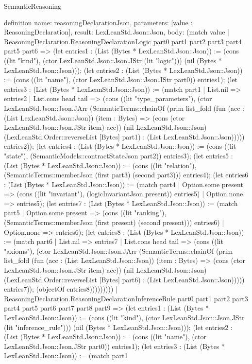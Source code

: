 \begin{lexlean}{SemanticReasoning}
\begin{semanticmodule}
definition{
  name: reasoningDeclarationJson,
  parameters: [value : ReasoningDeclaration],
  result: LexLeanStd.Json::Json,
  body: (match value
    | ReasoningDeclaration.ReasoningDeclarationLogic part0 part1 part2 part3 part4 part5 part6 => (let entries1 : (List (Bytes * LexLeanStd.Json::Json)) := (cons ((lit "kind"), (ctor LexLeanStd.Json::Json.JStr (lit "logic"))) (nil (Bytes * LexLeanStd.Json::Json))); (let entries2 : (List (Bytes * LexLeanStd.Json::Json)) := (cons ((lit "name"), (ctor LexLeanStd.Json::Json.JStr part0)) entries1); (let entries3 : (List (Bytes * LexLeanStd.Json::Json)) := (match part1
      | List.nil => entries2
      | List.cons head tail => (cons ((lit "type_parameters"), (ctor LexLeanStd.Json::Json.JArr (SemanticTerms::chainOf (prim list_fold (fun (acc : (List LexLeanStd.Json::Json)) (item : Bytes) => (cons (ctor LexLeanStd.Json::Json.JStr item) acc)) (nil LexLeanStd.Json::Json) (LexLeanStd.Order::reverseList [Bytes] part1) : (List LexLeanStd.Json::Json))))) entries2)); (let entries4 : (List (Bytes * LexLeanStd.Json::Json)) := (cons ((lit "state"), (SemanticModels::contractStateJson part2)) entries3); (let entries5 : (List (Bytes * LexLeanStd.Json::Json)) := (cons ((lit "relation"), (SemanticTerms::memberJson (first part3) (second part3))) entries4); (let entries6 : (List (Bytes * LexLeanStd.Json::Json)) := (match part4
      | Option.some present => (cons ((lit "invariant"), (logicInvariantJson present)) entries5)
      | Option.none => entries5); (let entries7 : (List (Bytes * LexLeanStd.Json::Json)) := (match part5
      | Option.some present => (cons ((lit "ranking"), (SemanticTerms::memberJson (first present) (second present))) entries6)
      | Option.none => entries6); (let entries8 : (List (Bytes * LexLeanStd.Json::Json)) := (match part6
      | List.nil => entries7
      | List.cons head tail => (cons ((lit "axioms"), (ctor LexLeanStd.Json::Json.JArr (SemanticTerms::chainOf (prim list_fold (fun (acc : (List LexLeanStd.Json::Json)) (item : Bytes) => (cons (ctor LexLeanStd.Json::Json.JStr item) acc)) (nil LexLeanStd.Json::Json) (LexLeanStd.Order::reverseList [Bytes] part6) : (List LexLeanStd.Json::Json))))) entries7)); (objectOf entries8)))))))))
    | ReasoningDeclaration.ReasoningDeclarationInferenceRule part0 part1 part2 part3 part4 part5 part6 part7 part8 part9 => (let entries1 : (List (Bytes * LexLeanStd.Json::Json)) := (cons ((lit "kind"), (ctor LexLeanStd.Json::Json.JStr (lit "inference_rule"))) (nil (Bytes * LexLeanStd.Json::Json))); (let entries2 : (List (Bytes * LexLeanStd.Json::Json)) := (cons ((lit "name"), (ctor LexLeanStd.Json::Json.JStr part0)) entries1); (let entries3 : (List (Bytes * LexLeanStd.Json::Json)) := (match part1
}
\end{semanticmodule}
\end{lexlean}
